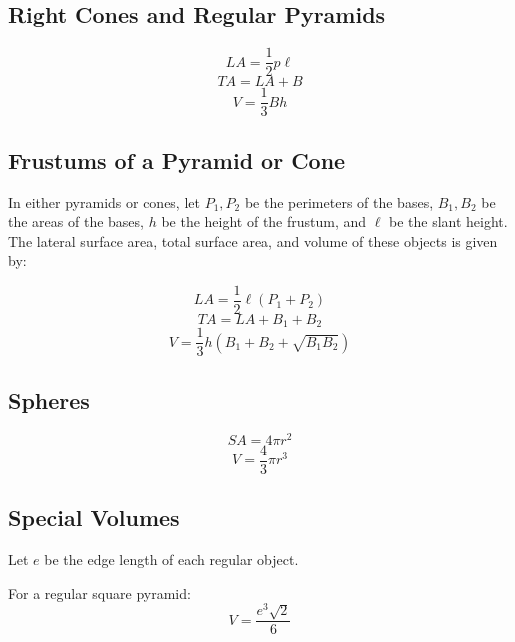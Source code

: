 \documentclass[final, letterpaper, 12pt]{article}
\begin{document}
	\subsection{Right Cones and Regular Pyramids}\label{sec: looking at the aspects of the pyramids/cones}
		\begin{equation}
			LA = \frac{1}{2}p\ell
		\end{equation}
		\begin{equation}
			TA = LA+B
		\end{equation}
		\begin{equation}
			V = \frac{1}{3}Bh
		\end{equation}
	\subsection{Frustums of a Pyramid or Cone}\label{sec: the special formulae relating to frustums}
		In either pyramids or cones, let $P_1, P_2$ be the perimeters of the bases, $B_1, B_2$ be the areas of the bases, $h$ be the height of the frustum, and $\ell$ be the slant height. The lateral surface area, total surface area, and volume of these objects is given by:
		
		\begin{equation}
			LA = \frac{1}{2}{\ell}(P_1 + P_2)
		\end{equation}
		\begin{equation}
			TA = LA + B_1 + B_2
		\end{equation}
		\begin{equation}
			V = \frac{1}{3}h\left(B_1 + B_2 + \sqrt{B_1 B_2}\right)
		\end{equation}
	\subsection{Spheres}\label{sec: properties of a sphere}
		\begin{equation}
			SA = 4\pi r^2
		\end{equation}
		\begin{equation}
			V = \frac{4}{3}\pi r^3
		\end{equation}
	\subsection{Special Volumes}\label{sec: volumes of regular square pyramid, regular octahedron, regular tetrahedron}
		Let $e$ be the edge length of each regular object.
		
		For a regular square pyramid:
		\begin{equation}
			V = \frac{e^3\sqrt{2}}{6}
		\end{equation}
		
\end{document}

